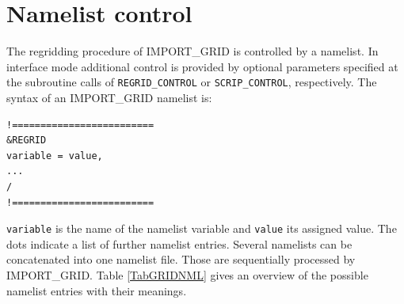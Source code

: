 \documentclass[11pt,twoside]{report}
\begin{document}
\section{Namelist control\label{IGNMLC}}
The regridding procedure of IMPORT\_GRID is controlled by a
 namelist. In interface mode additional control is provided by optional parameters
 specified at the subroutine calls of 
\verb|REGRID_CONTROL| or \verb|SCRIP_CONTROL|, respectively.
 The syntax of an IMPORT\_GRID namelist is:
\begin{verbatim}
!=========================
&REGRID
variable = value,
...
/
!=========================
\end{verbatim}
\verb|variable| is the name of the namelist variable and \verb|value|
its assigned value.
The dots indicate a list of further namelist entries.
 Several namelists can be concatenated into one namelist file. Those are
 sequentially processed by IMPORT\_GRID.
 Table \ref{TabGRIDNML} gives an overview of the possible namelist 
entries with their meanings.
\end{document}
